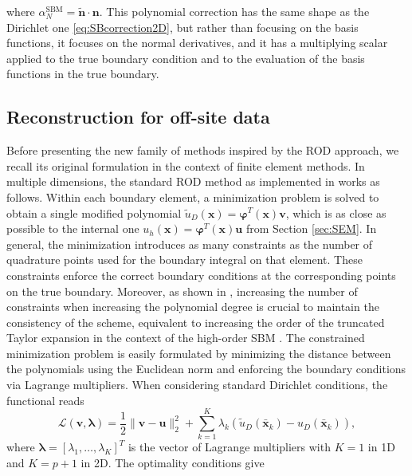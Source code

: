 \documentclass{article}
\renewcommand{\phi}{\varphi}
\begin{document}
where $\alpha_N^{\text{SBM}} = \tilde{\boldsymbol{n}}\cdot\boldsymbol{n}$. This polynomial correction has the same shape as the Dirichlet one \eqref{eq:SBcorrection2D}, but rather than focusing on the basis functions, it focuses on the normal derivatives, and it has a multiplying scalar applied to the true boundary condition and to the evaluation of the basis functions in the true boundary.

\subsection{Reconstruction for off-site data}\label{sec:ROD}

Before presenting the new family of methods inspired by the ROD approach, we recall its original formulation in the context of finite element methods. In multiple dimensions, the standard ROD method as implemented in \cite{santos2024very,ciallella2024very} works as follows. Within each boundary element, a minimization problem is solved to obtain a single modified polynomial $\tilde u_D(\boldsymbol{x})=\boldsymbol{\phi}^T(\boldsymbol{x})\boldsymbol{v}$, which is as close as possible to the internal one $u_h(\boldsymbol{x})=\boldsymbol{\phi}^T(\boldsymbol{x})\boldsymbol{u}$ from Section \ref{sec:SEM}. In general, the minimization introduces as many constraints as the number of quadrature points used for the boundary integral on that element. These constraints enforce the correct boundary conditions at the corresponding points on the true boundary. Moreover, as shown in \cite{santos2024very}, increasing the number of constraints when increasing the polynomial degree is crucial to maintain the consistency of the scheme, equivalent to increasing the order of the truncated Taylor expansion in the context of the high-order SBM \cite{atallah2022high}. The constrained minimization problem is easily formulated by minimizing the distance between the polynomials using the Euclidean norm and enforcing the boundary conditions via Lagrange multipliers. When considering standard Dirichlet conditions, the functional reads
\begin{equation}\label{eq:rod2dfunctional}
\mathcal{L}(\boldsymbol{v}, \boldsymbol{\lambda}) = \frac12 \|\boldsymbol{v}-\boldsymbol{u}\|^2_2 + \sum_{k=1}^K \lambda_k \left( \tilde u_D(\bar{\boldsymbol{x}}_k) - u_D(\bar{\boldsymbol{x}}_k) \right),
\end{equation}
where $\boldsymbol{\lambda} = [\lambda_1, \ldots, \lambda_K]^T$ is the vector of Lagrange multipliers with $K=1$ in 1D and $K=p+1$ in 2D. The optimality conditions give
\end{document}
